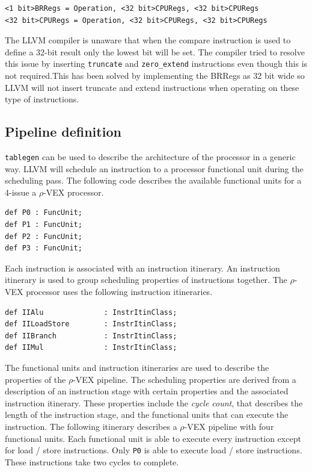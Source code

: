 \begin{lstlisting}
<1 bit>BRRegs = Operation, <32 bit>CPURegs, <32 bit>CPURegs
<32 bit>CPURegs = Operation, <32 bit>CPURegs, <32 bit>CPURegs
\end{lstlisting}

The LLVM compiler is unaware that when the compare instruction is used to define a 32-bit result only the lowest bit will be set. The compiler tried to resolve this issue by inserting \texttt{truncate} and \texttt{zero\_extend} instructions even though this is not required.This has been solved by implementing the BRRegs as 32 bit wide so LLVM will not insert truncate and extend instructions when operating on these type of instructions.

\subsection{Pipeline definition}
\texttt{tablegen} can be used to describe the architecture of the processor in a generic way. LLVM will schedule an instruction to a processor functional unit during the scheduling pass. The following code describes the available functional units for a 4-issue a $\rho$-VEX processor.

\begin{lstlisting}[language=tblgen]
def P0 : FuncUnit;
def P1 : FuncUnit;
def P2 : FuncUnit;
def P3 : FuncUnit;
\end{lstlisting}

Each instruction is associated with an instruction itinerary. An instruction itinerary is used to group scheduling properties of instructions together. The $\rho$-VEX processor uses the following instruction itineraries.

\begin{lstlisting}[language=tblgen]
def IIAlu              : InstrItinClass;
def IILoadStore        : InstrItinClass;
def IIBranch           : InstrItinClass;
def IIMul              : InstrItinClass;
\end{lstlisting}

The functional units and instruction itineraries are used to describe the properties of the $\rho$-VEX pipeline. The scheduling properties are derived from a description of an instruction stage with certain properties and the associated instruction itinerary. These properties include the \emph{cycle count}, that describes the length of the instruction stage, and the functional units that can execute the instruction. The following itinerary describes a $\rho$-VEX pipeline with four functional units. Each functional unit is able to execute every instruction except for load / store instructions. Only \texttt{P0} is able to execute load / store instructions. These instructions take two cycles to complete.

